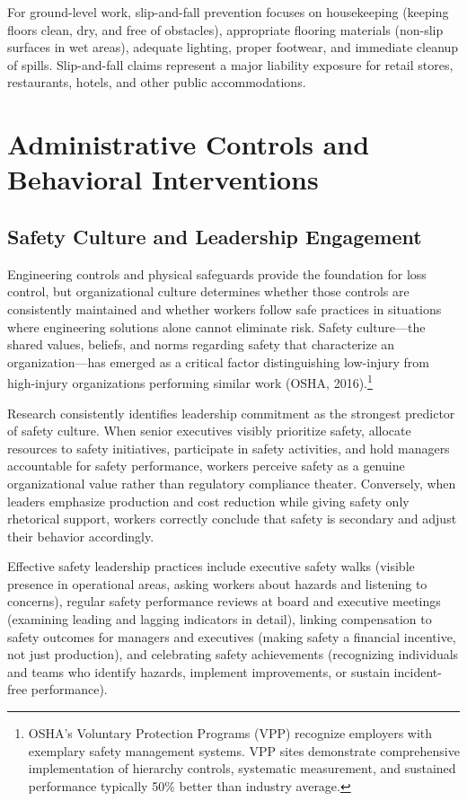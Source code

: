 \documentclass[11pt,openany]{book}
\begin{document}
For ground-level work, slip-and-fall prevention focuses on housekeeping
(keeping floors clean, dry, and free of obstacles), appropriate flooring
materials (non-slip surfaces in wet areas), adequate lighting, proper
footwear, and immediate cleanup of spills. Slip-and-fall claims represent a
major liability exposure for retail stores, restaurants, hotels, and other
public accommodations.

\section{Administrative Controls and Behavioral Interventions}
\label{sec:admin-controls}

\subsection{Safety Culture and Leadership Engagement}

Engineering controls and physical safeguards provide the foundation for loss
control, but organizational culture determines whether those controls are
consistently maintained and whether workers follow safe practices in
situations where engineering solutions alone cannot eliminate risk. Safety
culture---the shared values, beliefs, and norms regarding safety that
characterize an organization---has emerged as a critical factor distinguishing
low-injury from high-injury organizations performing similar work (OSHA,
2016).\footnote{OSHA's Voluntary Protection Programs (VPP) recognize employers
with exemplary safety management systems. VPP sites demonstrate comprehensive
implementation of hierarchy controls, systematic measurement, and sustained
performance typically 50\% better than industry average.}

Research consistently identifies leadership commitment as the strongest
predictor of safety culture. When senior executives visibly prioritize safety,
allocate resources to safety initiatives, participate in safety activities,
and hold managers accountable for safety performance, workers perceive safety
as a genuine organizational value rather than regulatory compliance theater.
Conversely, when leaders emphasize production and cost reduction while giving
safety only rhetorical support, workers correctly conclude that safety is
secondary and adjust their behavior accordingly.

Effective safety leadership practices include executive safety walks (visible
presence in operational areas, asking workers about hazards and listening to
concerns), regular safety performance reviews at board and executive meetings
(examining leading and lagging indicators in detail), linking compensation to
safety outcomes for managers and executives (making safety a financial
incentive, not just production), and celebrating safety achievements
(recognizing individuals and teams who identify hazards, implement
improvements, or sustain incident-free performance).
\end{document}
